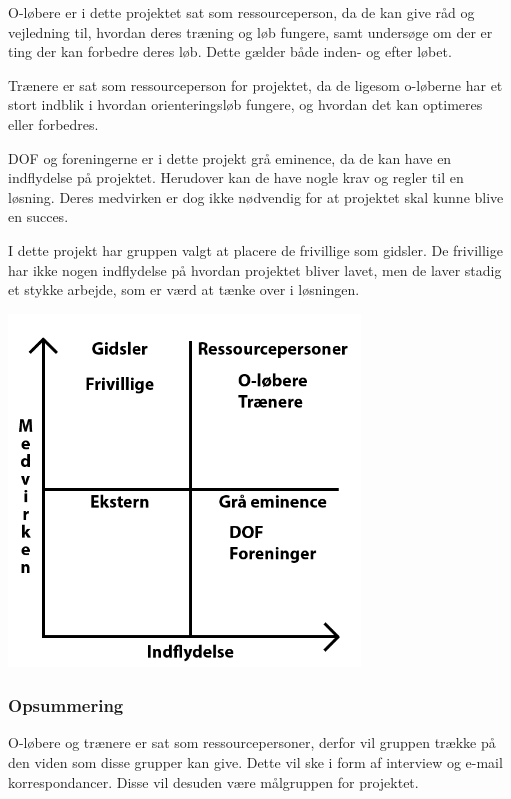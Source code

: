 O-løbere er i dette projektet sat som ressourceperson, da de kan give råd og vejledning til, hvordan deres træning og løb fungere, samt undersøge om der er ting der kan forbedre deres løb. Dette gælder både inden- og efter løbet.

Trænere er sat som ressourceperson for projektet, da de ligesom o-løberne har et stort indblik i hvordan orienteringsløb fungere, og hvordan det kan optimeres eller forbedres. 

DOF og foreningerne er i dette projekt grå eminence, da de kan have en indflydelse på projektet. Herudover kan de have nogle krav og regler til en løsning. Deres medvirken er dog ikke nødvendig for at projektet skal kunne blive en succes.

I dette projekt har gruppen valgt at placere de frivillige som gidsler. De frivillige har ikke nogen indflydelse på hvordan projektet bliver lavet, men de laver stadig et stykke arbejde, som er værd at tænke over i løsningen.    

\includegraphics[width=0.70\textwidth]{billeder/Prio}
\vspace{0.20cm}

\subsubsection{Opsummering}
O-løbere og trænere er sat som ressourcepersoner, derfor vil gruppen trække på den viden som disse grupper kan give. Dette vil ske i form af interview og e-mail korrespondancer. Disse vil desuden være målgruppen for projektet.